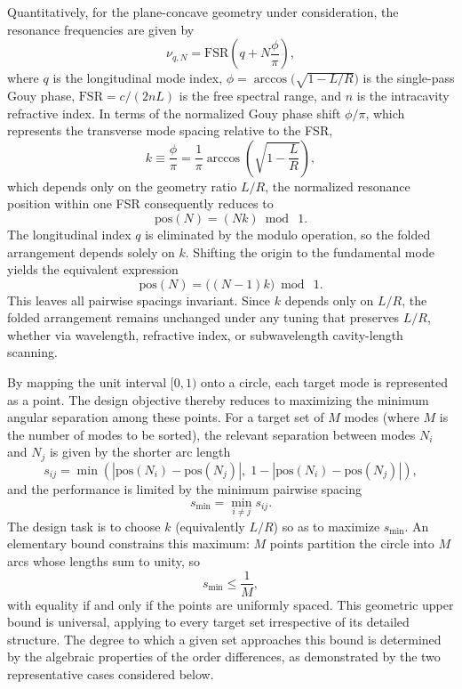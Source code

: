 \documentclass{optica-article}
\begin{document}
Quantitatively, for the plane-concave geometry under consideration, the resonance frequencies are given by
\begin{equation}
\nu_{q,N} = \mathrm{FSR}\!\left(q + N\frac{\phi}{\pi}\right),
\label{eq:oe_resonance}
\end{equation}
where $q$ is the longitudinal mode index, $\phi=\arccos\!\bigl(\sqrt{1-L/R}\bigr)$ is the single-pass Gouy phase, $\mathrm{FSR}=c/(2nL)$ is the free spectral range, and $n$ is the intracavity refractive index. In terms of the normalized Gouy phase shift $\phi/\pi$, which represents the transverse mode spacing relative to the FSR,
\begin{equation}
k \equiv \frac{\phi}{\pi} = \frac{1}{\pi}\arccos\!\left(\sqrt{1-\frac{L}{R}}\right),
\label{eq:oe_k_def}
\end{equation}
which depends only on the geometry ratio $L/R$, the normalized resonance position within one FSR consequently reduces to
\begin{equation}
\mathrm{pos}(N) = (Nk)\bmod~1.
\label{eq:oe_pos}
\end{equation}
The longitudinal index $q$ is eliminated by the modulo operation, so the folded arrangement depends solely on $k$. Shifting the origin to the fundamental mode yields the equivalent expression
\begin{equation}
\mathrm{pos}(N) = \bigl((N-1)k\bigr)\bmod~1.
\label{eq:oe_pos_l}
\end{equation}
This leaves all pairwise spacings invariant. Since $k$ depends only on $L/R$, the folded arrangement remains unchanged under any tuning that preserves $L/R$, whether via wavelength, refractive index, or subwavelength cavity-length scanning.

By mapping the unit interval $[0,1)$ onto a circle, each target mode is represented as a point. The design objective thereby reduces to maximizing the minimum angular separation among these points. For a target set of $M$ modes (where $M$ is the number of modes to be sorted), the relevant separation between modes $N_i$ and $N_j$ is given by the shorter arc length
\begin{equation}
s_{ij}=\min\!\left(|\mathrm{pos}(N_i)-\mathrm{pos}(N_j)|,\;1-|\mathrm{pos}(N_i)-\mathrm{pos}(N_j)|\right),
\label{eq:oe_sij}
\end{equation}
and the performance is limited by the minimum pairwise spacing
\begin{equation}
s_{\min}=\min_{i\neq j}s_{ij}.
\label{eq:oe_smin}
\end{equation}
The design task is to choose $k$ (equivalently $L/R$) so as to maximize $s_{\min}$. An elementary bound constrains this maximum: $M$ points partition the circle into $M$ arcs whose lengths sum to unity, so
\begin{equation}
s_{\min}\le \frac{1}{M},
\label{eq:oe_smin_upper}
\end{equation}
with equality if and only if the points are uniformly spaced. This geometric upper bound is universal, applying to every target set irrespective of its detailed structure. The degree to which a given set approaches this bound is determined by the algebraic properties of the order differences, as demonstrated by the two representative cases considered below.
\end{document}
